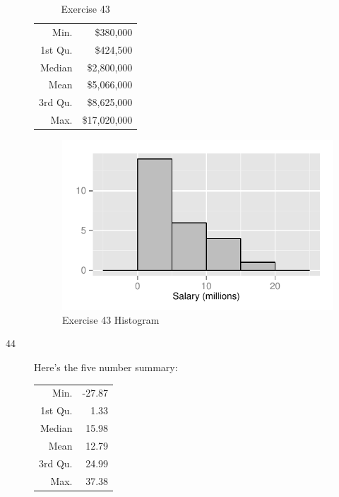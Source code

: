 \documentclass[letterpaper, landscape]{exam}
\begin{document}
\begin{description}
        \begin{table}[H]
          \centering
          \begin{tabular}{rr}
            \toprule
            Min.    & \$380,000 \\
            1st Qu. & \$424,500 \\
            Median  & \$2,800,000 \\
            Mean    & \$5,066,000 \\
            3rd Qu. & \$8,625,000 \\
            Max.    & \$17,020,000 \\
            \bottomrule
          \end{tabular}
          \caption{Exercise 43}
        \end{table}
        \begin{figure}[H]
          \centering
          \includegraphics{figures/ex43.pdf}
          \caption{Exercise 43 Histogram}
        \end{figure}


      \item[44]
        Here's the five number summary:

        \begin{table}[H]
          \centering
          \begin{tabular}{rr}
            \toprule
            Min.    & -27.87 \\
            1st Qu. & 1.33 \\
            Median  & 15.98 \\
            Mean    & 12.79 \\
            3rd Qu. & 24.99 \\
            Max.    & 37.38 \\
            \bottomrule
          \end{tabular}
        \end{table}


\end{description}
\end{document}
